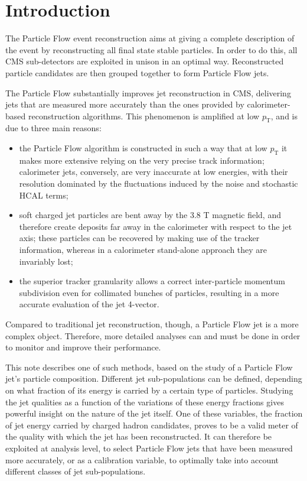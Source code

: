 \documentclass{cmspaper}
\begin{document}
\section{Introduction}

The Particle Flow event reconstruction \cite{pflow} aims at giving a complete description of the event by reconstructing all final state stable particles. In order to do this, all CMS sub-detectors are exploited in unison in an optimal way. Reconstructed particle candidates are then grouped together to form Particle Flow jets.

The Particle Flow substantially improves jet reconstruction in CMS, delivering jets that are measured more accurately than the ones provided by calorimeter-based reconstruction algorithms. This phenomenon is amplified at low $p_{\mathrm{T}}$, and is due to three main reasons:
\begin{itemize}
\item the Particle Flow algorithm is constructed in such a way that at low $p_{\mathrm{T}}$ it makes more extensive relying on the very precise track information; calorimeter jets, conversely, are very inaccurate at low energies, with their resolution dominated by the fluctuations induced by the noise and stochastic HCAL terms;
\item soft charged jet particles are bent away by the 3.8 T magnetic field, and therefore create deposits far away in the calorimeter with respect to the jet axis; these particles can be recovered by making use of the tracker information, whereas in a calorimeter stand-alone approach they are invariably lost;
\item the superior tracker granularity allows a correct inter-particle momentum subdivision even for collimated bunches of particles, resulting in a more accurate evaluation of the jet 4-vector.
\end{itemize}

Compared to traditional jet reconstruction, though, a Particle Flow jet is a more complex object. Therefore, more detailed analyses can and must be done in order to monitor and improve their performance.

This note describes one of such methods, based on the study of a Particle Flow jet's particle composition. Different jet sub-populations can be defined, depending on what fraction of its energy is carried by a certain type of particles. Studying the jet qualities as a function of the variations of these energy fractions gives powerful insight on the nature of the jet itself. One of these variables, the fraction of jet energy carried by charged hadron candidates, proves to be a valid meter of the quality with which the jet has been reconstructed. It can therefore be exploited at analysis level, to select Particle Flow jets that have been measured more accurately, or as a calibration variable, to optimally take into account different classes of jet sub-populations.
\end{document}
